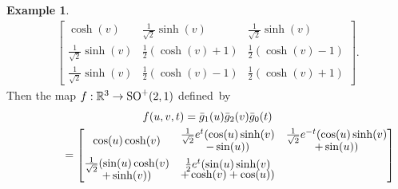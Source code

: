 \documentclass[10pt,a4paper]{amsart}
\numberwithin{equation}{section}
\theoremstyle{definition}
\newtheorem{exmpl}[teo]{Example}
\begin{document}
\begin{exmpl}
\begin{gather*}
\begin{bmatrix}
\cosh(v) & \frac{1}{\sqrt{2}}\sinh(v) & \frac{1}{\sqrt{2}}\sinh(v)
\\
\frac{1}{\sqrt{2}}\sinh(v) & \frac{1}{2}(\cosh(v) + 1) & \frac{1}{2}(\cosh(v) - 1)
\\
\frac{1}{\sqrt{2}}\sinh(v) & \frac{1}{2}(\cosh(v) - 1) & \frac{1}{2}(\cosh(v) + 1)
\end{bmatrix}.
\end{gather*}
Then the map $f: \mathbb{R}^3 \to {\rm SO}^+(2,1)$ def\/ined~by
\begin{gather*}
f(u,v,t) = \bar{g}_1(u) \bar{g}_2(v) \bar{g}_0(t)\\
\hphantom{f(u,v,t)}{} = \begin{bmatrix}
\cos(u) \cosh(v) & \begin{array}{@{}c@{}}\frac{1}{\sqrt{2}} e^t(\cos(u) \sinh(v)\vspace{-1mm}\\ -\sin(u))\end{array} &
\begin{array}{@{}c@{}}\frac{1}{\sqrt{2}} e^{-t}(\cos(u) \sinh(v)\vspace{-1mm}\\+\sin(u))\end{array}
\vspace{1mm}\\
\begin{array}{@{}c@{}}\frac{1}{\sqrt{2}}(\sin(u)\cosh(v)\vspace{-1mm}\\+\sinh(v))\end{array} &
\begin{array}{@{}c@{}}\frac{1}{2}e^t(\sin(u)\sinh(v)\vspace{-1mm}\\+\cosh(v)+\cos(u))\end{array} &

\end{bmatrix}
\end{gather*}
\end{exmpl}
\end{document}
